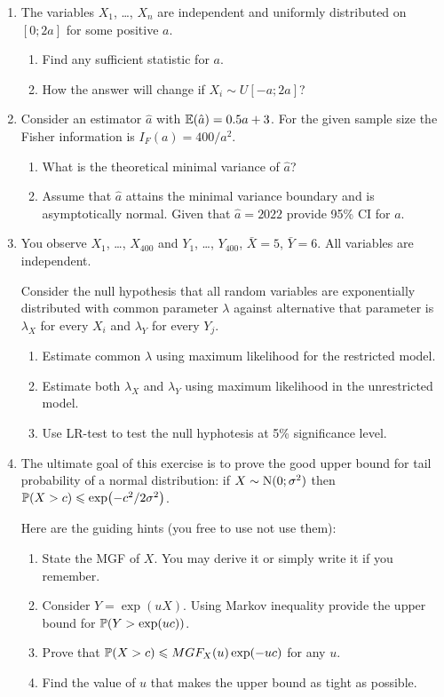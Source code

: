 \begin{enumerate}
\item The variables $X_1$, \ldots, $X_n$ are independent and uniformly distributed on $[0; 2a]$ for some positive $a$. 

\begin{enumerate}
	\item Find any sufficient statistic for $a$. 
	\item How the answer will change if $X_i \sim U[-a; 2a]$?
\end{enumerate}

\item Consider an estimator $\hat a$ with $\E(\hat a) = 0.5a + 3$. For the given sample size the Fisher information is $I_F(a) = 400/a^2$.
\begin{enumerate}
	\item What is the theoretical minimal variance of $\hat a$?
	\item Assume that $\hat a$ attains the minimal variance boundary and is asymptotically normal. Given that $\hat a = 2022$ provide 95\% CI for $a$.
\end{enumerate}

\item You observe $X_1$, \ldots, $X_{400}$ and $Y_1$, \ldots, $Y_{400}$, $\bar X = 5$, $\bar Y = 6$. 
All variables are independent. 

Consider the null hypothesis that all random variables are exponentially distributed with common parameter $\lambda$ against alternative
that parameter is $\lambda_X$ for every $X_i$ and $\lambda_Y$ for every $Y_j$. 

\begin{enumerate}
	\item Estimate common $\lambda$ using maximum likelihood for the restricted model. 
	\item Estimate both $\lambda_X$ and $\lambda_Y$ using maximum likelihood in the unrestricted model. 
	\item Use LR-test to test the null hyphotesis at 5\% significance level. 
\end{enumerate}

\item The ultimate goal of this exercise is to prove the good upper bound for tail probability of a normal distribution: 
if $X\sim \cN(0; \sigma^2)$ then $\P(X > c) \leq \exp(-c^2/2\sigma^2)$.

Here are the guiding hints (you free to use not use them): 

\begin{enumerate}
	\item State the MGF of $X$. You may derive it or simply write it if you remember.
	\item Consider $Y = \exp(uX)$. Using Markov inequality provide the upper bound for $\P(Y > \exp(uc))$.
	\item Prove that $\P(X > c) \leq MGF_X(u)\exp(-uc)$ for any $u$.
	\item Find the value of $u$ that makes the upper bound as tight as possible. 
\end{enumerate}



\end{enumerate}
